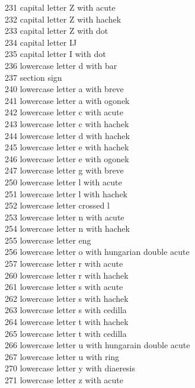 \documentclass{article}
\renewcommand{\-}{\discretionary{\char'0177 }{}{}}
\begin{document}
\begin{tabbing}
231 \> capital letter Z with acute\\
232 \> capital letter Z with hachek\\
233 \> capital letter Z with dot\\
234 \> capital letter IJ\\
235 \> capital letter I with dot\\
236 \> lowercase letter d with bar\\
237 \> section sign\\
240 \> lowercase letter a with breve\\
241 \> lowercase letter a with ogonek\\
242 \> lowercase letter c with acute\\
243 \> lowercase letter c with hachek\\
244 \> lowercase letter d with hachek\\
245 \> lowercase letter e with hachek\\
246 \> lowercase letter e with ogonek\\
247 \> lowercase letter g with breve\\
250 \> lowercase letter l with acute\\
251 \> lowercase letter l with hachek\\
252 \> lowercase letter crossed l\\
253 \> lowercase letter n with acute\\
254 \> lowercase letter n with hachek\\
255 \> lowercase letter eng\\
256 \> lowercase letter o with hungarian double acute\\
257 \> lowercase letter r with acute\\
260 \> lowercase letter r with hachek\\
261 \> lowercase letter s with acute\\
262 \> lowercase letter s with hachek\\
263 \> lowercase letter s with cedilla\\
264 \> lowercase letter t with hachek\\
265 \> lowercase letter t with cedilla\\
266 \> lowercase letter u with hungarain double acute\\
267 \> lowercase letter u with ring\\
270 \> lowercase letter y with diaeresis\\
271 \> lowercase letter z with acute\\

\end{tabbing}
\end{document}
